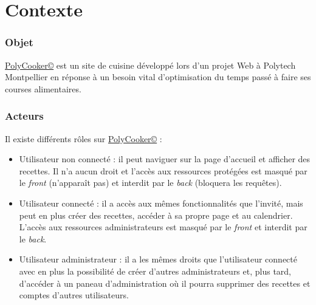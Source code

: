 \part{Contexte}
\section{Objet}
\href{https://polycooker.cluster-ig3.igpolytech.fr/}{PolyCooker©} est un site de cuisine développé lors d'un projet Web à Polytech Montpellier en réponse à un besoin vital d'optimisation du temps passé à faire ses courses alimentaires.
\section{Acteurs}
Il existe différents rôles sur \href{https://polycooker.cluster-ig3.igpolytech.fr/}{PolyCooker©} :
\begin{itemize}
	\item Utilisateur non connecté : il peut naviguer sur la page d'accueil et afficher des recettes. Il n'a aucun droit et l'accès aux ressources protégées est masqué par le \textit{front} (n'apparaît pas) et interdit par le \textit{back} (bloquera les requêtes).
	\item Utilisateur connecté : il a accès aux mêmes fonctionnalités que l'invité, mais peut en plus créer des recettes, accéder à sa propre page et au calendrier. L'accès aux ressources administrateurs est masqué par le \textit{front} et interdit par le \textit{back}.
	\item Utilisateur administrateur : il a les mêmes droits que l'utilisateur connecté avec en plus la possibilité de créer d'autres administrateurs et, plus tard, d'accéder à un paneau d'administration où il pourra supprimer des recettes et comptes d'autres utilisateurs.
\end{itemize}

